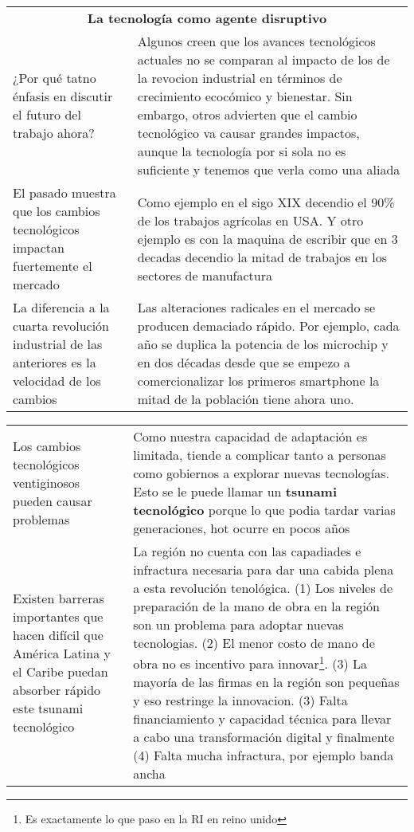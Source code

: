 \begingroup
\setlength{\tabcolsep}{12pt} %
\renewcommand{\arraystretch}{1.5} %
\begin{tabular}{p{4cm}|p{11cm}}
\multicolumn{2}{c}{\large \bf  La tecnología como agente disruptivo}  \\
¿Por qué tatno énfasis en discutir el futuro del trabajo ahora?&Algunos creen que los avances tecnológicos actuales no se comparan al impacto de los de la revocion industrial en términos de crecimiento ecocómico y bienestar. Sin embargo, otros advierten que el cambio tecnológico va causar grandes impactos, aunque la tecnología por si sola no es suficiente y tenemos que verla como una aliada\\
El pasado muestra que los cambios tecnológicos impactan fuertemente el mercado&Como ejemplo en el sigo XIX decendio el 90\% de los trabajos agrícolas en USA. Y otro ejemplo es con la maquina de escribir que en 3 decadas decendio la mitad de trabajos en los sectores de manufactura\\
La diferencia a la cuarta revolución industrial de las anteriores es la velocidad de los cambios&Las alteraciones radicales en el mercado se producen demaciado rápido. Por ejemplo, cada año se duplica la potencia de los microchip y en dos décadas desde que se empezo a comercionalizar los primeros smartphone la mitad de la población tiene ahora uno.\\
\end{tabular}
\endgroup


\begingroup
\setlength{\tabcolsep}{12pt} %
\renewcommand{\arraystretch}{1.5} %
\begin{tabular}{p{4cm}|p{11cm}}
Los cambios tecnológicos ventiginosos pueden causar problemas&Como nuestra capacidad de adaptación es limitada, tiende a complicar tanto a personas como gobiernos a explorar nuevas tecnologías. Esto se le puede llamar un {\bf tsunami tecnológico} porque lo que podia tardar varias generaciones, hot ocurre en pocos años\\
Existen barreras importantes que hacen difícil que América  Latina y el Caribe puedan absorber rápido este tsunami tecnológico&La región no cuenta con las capadiades e infractura necesaria para dar una cabida plena a esta revolución tenológica. (1) Los niveles de preparación de la mano de obra en la región son un problema para adoptar nuevas tecnologias. (2) El menor costo de mano de obra no es incentivo para innovar\footnote{Es exactamente lo que paso en la RI en reino unido}. (3) La mayoría de las firmas en la región son pequeñas y eso restringe la innovacion. (3) Falta financiamiento y capacidad técnica para llevar a cabo una transformación digital y finalmente (4) Falta mucha infractura, por ejemplo banda ancha\\
\end{tabular}
\endgroup


